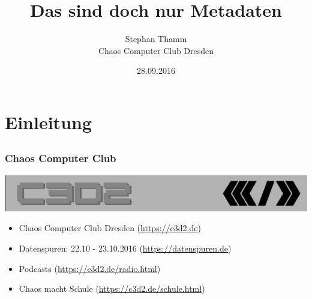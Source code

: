 \documentclass[12pt]{beamer}
\title{Das sind doch nur Metadaten}
\author{\small Stephan Thamm\\\large Chaos Computer Club Dresden}
\date{28.09.2016}
\begin{document}
\maketitle

\section{Einleitung}
\subsection{}

\begin{frame}
  \frametitle{Chaos Computer Club}
  \begin{center}
    \includegraphics[height=0.1\textheight]{img/c3d2_logo.png}
  \end{center}
  \begin{itemize}
    \item<1-> Chaos Computer Club Dresden (\url{https://c3d2.de})          
    \item<2-> Datenspuren: 22.10 - 23.10.2016 (\url{https://datenspuren.de})
    \item<3-> Podcasts (\url{https://c3d2.de/radio.html})
    \item<4-> Chaos macht Schule (\url{https://c3d2.de/schule.html})
  \end{itemize}
\end{frame}
\end{document}
